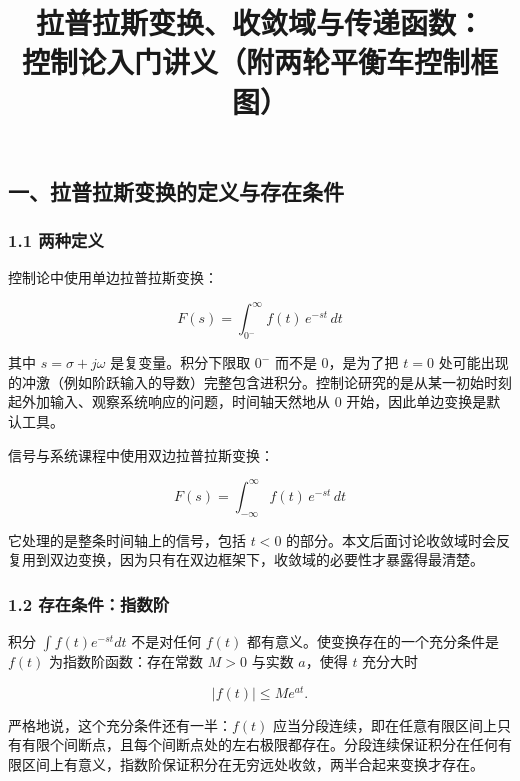 \documentclass[12pt]{ctexart}
\title{拉普拉斯变换、收敛域与传递函数：\\控制论入门讲义（附两轮平衡车控制框图）}
\author{}
\date{}
\begin{document}
\maketitle
\tableofcontents
\newpage
\hypertarget{ux4e00ux62c9ux666eux62c9ux65afux53d8ux6362ux7684ux5b9aux4e49ux4e0eux5b58ux5728ux6761ux4ef6}{%
\subsection{一、拉普拉斯变换的定义与存在条件}\label{ux4e00ux62c9ux666eux62c9ux65afux53d8ux6362ux7684ux5b9aux4e49ux4e0eux5b58ux5728ux6761ux4ef6}}

\hypertarget{ux4e24ux79cdux5b9aux4e49}{%
\subsubsection{1.1 两种定义}\label{ux4e24ux79cdux5b9aux4e49}}

控制论中使用单边拉普拉斯变换：

\[
F(s)=\int_{0^{-}}^{\infty} f(t)\,e^{-st}\,dt
\]

其中 \(s=\sigma+j\omega\) 是复变量。积分下限取 \(0^{-}\) 而不是
\(0\)，是为了把 \(t=0\)
处可能出现的冲激（例如阶跃输入的导数）完整包含进积分。控制论研究的是从某一初始时刻起外加输入、观察系统响应的问题，时间轴天然地从
\(0\) 开始，因此单边变换是默认工具。

信号与系统课程中使用双边拉普拉斯变换：

\[
F(s)=\int_{-\infty}^{\infty} f(t)\,e^{-st}\,dt
\]

它处理的是整条时间轴上的信号，包括 \(t<0\)
的部分。本文后面讨论收敛域时会反复用到双边变换，因为只有在双边框架下，收敛域的必要性才暴露得最清楚。

\hypertarget{ux5b58ux5728ux6761ux4ef6ux6307ux6570ux9636}{%
\subsubsection{1.2
存在条件：指数阶}\label{ux5b58ux5728ux6761ux4ef6ux6307ux6570ux9636}}

积分 \(\int f(t)e^{-st}dt\) 不是对任何 \(f(t)\)
都有意义。使变换存在的一个充分条件是 \(f(t)\) 为指数阶函数：存在常数
\(M>0\) 与实数 \(a\)，使得 \(t\) 充分大时

\[
|f(t)|\le Me^{at}.
\]

严格地说，这个充分条件还有一半：\(f(t)\)
应当分段连续，即在任意有限区间上只有有限个间断点，且每个间断点处的左右极限都存在。分段连续保证积分在任何有限区间上有意义，指数阶保证积分在无穷远处收敛，两半合起来变换才存在。
\end{document}
